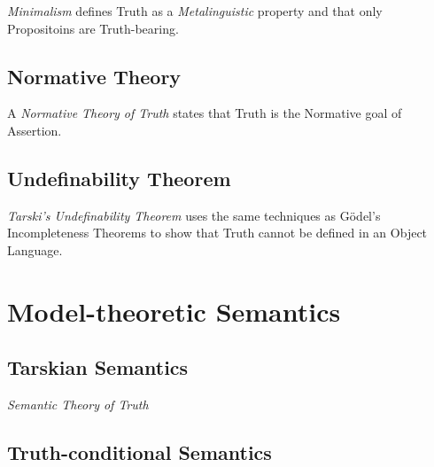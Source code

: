 \emph{Minimalism} defines Truth as a \emph{Metalinguistic} property
and that only Propositoins are Truth-bearing.



\subsection{Normative Theory}\label{sec:normative_theory}

A \emph{Normative Theory of Truth} states that Truth is the Normative
goal of Assertion.



\subsection{Undefinability Theorem}\label{sec:undefinability_theorem}

\emph{Tarski's Undefinability Theorem} \cite{tarski36} uses the same
techniques as G\"odel's Incompleteness Theorems to show that Truth
cannot be defined in an Object Language.



\section{Model-theoretic Semantics}\label{sec:model_semantics}

\subsection{Tarskian Semantics}\label{sec:tarski_semantics}

\emph{Semantic Theory of Truth}



\subsection{Truth-conditional Semantics}
\label{sec:truth_conditional_semantics}


